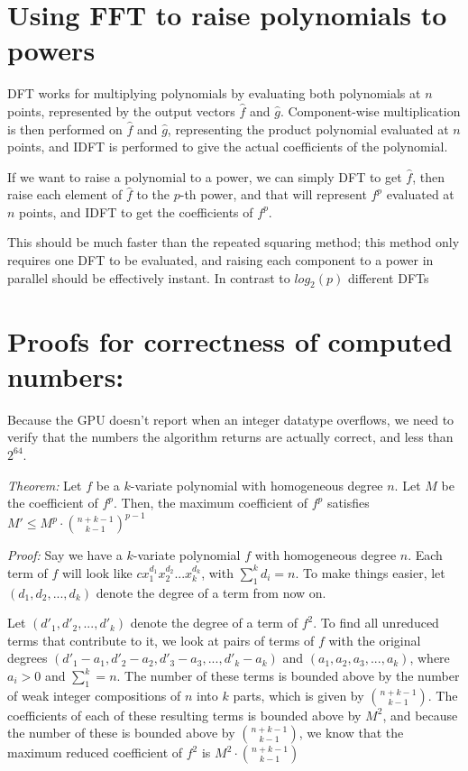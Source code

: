 \documentclass{article}
\begin{document}
\section*{Using FFT to raise polynomials to powers}
DFT works for multiplying polynomials by evaluating both polynomials at $n$ points, represented by the output vectors $\hat{f}$ and $\hat{g}$. Component-wise multiplication is then performed on $\hat{f}$ and $\hat{g}$, representing the product polynomial evaluated at $n$ points, and IDFT is performed to give the actual coefficients of the polynomial.

If we want to raise a polynomial to a power, we can simply DFT to get $\hat{f}$, then raise each element of $\hat{f}$ to the $p$-th power, and that will represent $f^p$ evaluated at $n$ points, and IDFT to get the coefficients of $f^p$.

This should be much faster than the repeated squaring method; this method only requires one DFT to be evaluated, and raising each component to a power in parallel should be effectively instant. In contrast to $log_2(p)$ different DFTs

\section*{Proofs for correctness of computed numbers:}

Because the GPU doesn't report when an integer datatype overflows, we need to verify that the numbers the algorithm returns are actually correct, and less than $2^{64}$.

\textit{Theorem: } Let $f$ be a $k$-variate polynomial with homogeneous degree $n$. Let $M$ be the coefficient of $f^p$. Then, the maximum coefficient of $f^p$ satisfies $M' \le M^p \cdot \binom{n + k - 1}{k - 1}^{p-1}$

\textit{Proof: } Say we have a $k$-variate polynomial $f$ with homogeneous degree $n$. Each term of $f$ will look like $cx_{1}^{d_1}x_{2}^{d_2}...x_{k}^{d_k}$, with $ \sum_{1}^{k} d_i = n$. To make things easier, let $(d_1, d_2, ... , d_k)$ denote the degree of a term from now on.

Let $(d'_1, d'_2, ... , d'_k)$ denote the degree of a term of $f^2$. To find all unreduced terms that contribute to it, we look at pairs of terms of $f$ with the original degrees $(d'_1 - a_1, d'_2 - a_2, d'_3 - a_3, ... , d'_k - a_k)$ and $(a_1, a_2, a_3, ... , a_k)$, where $a_i > 0$ and $\sum_{1}^{k} = n$. The number of these terms is bounded above by the number of weak integer compositions of $n$ into $k$ parts, which is given by $\binom{n + k - 1}{k - 1}$. The coefficients of each of these resulting terms is bounded above by $M^2$, and because the number of these is bounded above by $\binom{n + k - 1}{k - 1}$, we know that the maximum reduced coefficient of $f^2$ is $M^2 \cdot \binom{n + k - 1}{k - 1}$
\end{document}
